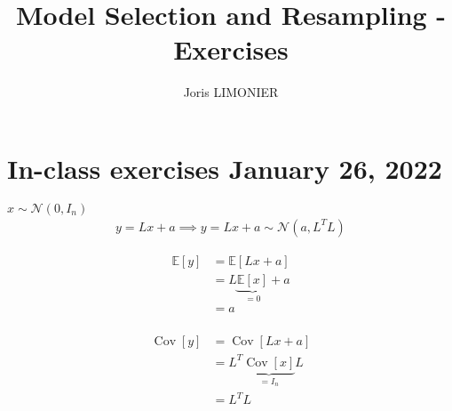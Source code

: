 \documentclass{article}
\title{Model Selection and Resampling - Exercises}
\author{Joris LIMONIER}
\newcommand{\E}{\mathbb{E}}
\newcommand{\1}{\mathbf{1}}
\newcommand{\cov}{\operatorname{Cov}}
\newcommand{\gauss}{\mathcal{N}}
\begin{document}
\maketitle

\section{In-class exercises January 26, 2022}
\(x \sim \gauss(0, I_n)\)
  \begin{align*}
  y = Lx + a \implies y = Lx + a \sim \gauss(a, L^T L)
\end{align*}

\begin{align*}
  \E \left[ y \right]
  &=
  \E \left[ Lx + a \right] \\
  &=
  L \underbrace{\E \left[ x \right]}_{=0} + a \\
  &=
  a \\
\end{align*}

\begin{align*}
  \cov \left[ y \right]
  &=
  \cov \left[ Lx + a \right] \\
  &=
  L^T \underbrace{\cov \left[ x \right]}_{=I_n} L \\
  &=
  L^T L \\
\end{align*}
\end{document}
